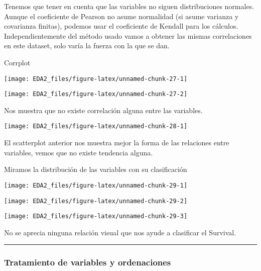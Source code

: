 \documentclass[
]{article}
\begin{document}
Tenemos que tener en cuenta que las variables no siguen distribuciones
normales. Aunque el coeficiente de Pearson no asume normalidad (si asume
varianza y covarianza finitas), podemos usar el coeficiente de Kendall
para los cálculos. Independientemente del método usado vamos a obtener
las mismas correlaciones en este dataset, solo varía la fuerza con la
que se dan.

Corrplot

\begin{center}\texttt{[image: EDA2\_files/figure-latex/unnamed-chunk-27-1]} \end{center}

\begin{center}\texttt{[image: EDA2\_files/figure-latex/unnamed-chunk-27-2]} \end{center}

Nos muestra que no existe correlación alguna entre las variables.

\begin{center}\texttt{[image: EDA2\_files/figure-latex/unnamed-chunk-28-1]} \end{center}

El scatterplot anterior nos muestra mejor la forma de las relaciones
entre variables, vemos que no existe tendencia alguna.

Miramos la distribución de las variables con su clasificación

\begin{center}\texttt{[image: EDA2\_files/figure-latex/unnamed-chunk-29-1]} \end{center}

\begin{center}\texttt{[image: EDA2\_files/figure-latex/unnamed-chunk-29-2]} \end{center}

\begin{center}\texttt{[image: EDA2\_files/figure-latex/unnamed-chunk-29-3]} \end{center}

No se aprecia ninguna relación visual que nos ayude a clasificar el
Survival.

\begin{center}\rule{0.5\linewidth}{0.5pt}\end{center}

\hypertarget{tratamiento-de-variables-y-ordenaciones}{%
\subsubsection{Tratamiento de variables y
ordenaciones}\label{tratamiento-de-variables-y-ordenaciones}}
\end{document}
